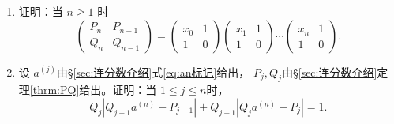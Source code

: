 \begin{exercise}
\begin{enumerate}
\begin{enumerate}[label=(\roman*)]
		      \end{enumerate}
		\item 证明：当 \( n \geqslant 1 \) 时
		      \begin{equation*}
			      \begin{pmatrix}
				      P_n & P_{n-1} \\
				      Q_n & Q_{n-1}
			      \end{pmatrix}
			      =
			      \begin{pmatrix}
				      x_0 & 1 \\
				      1   & 0
			      \end{pmatrix}
			      \begin{pmatrix}
				      x_1 & 1 \\
				      1   & 0
			      \end{pmatrix}
			      \cdots
			      \begin{pmatrix}
				      x_n & 1 \\
				      1   & 0
			      \end{pmatrix}.
		      \end{equation*}
		\item 设 \( a^{(j)} \)由\S\ref{sec:连分数介绍}式\eqref{eq:an标记}给出， \( P_j, Q_j
		      \)由\S\ref{sec:连分数介绍}定理\ref{thrm:PQ}给出。证明：当 \( 1 \leqslant j \leqslant n \)时，
		      \begin{equation*}
			      Q_j|Q_{j-1}a^{(n)}-P_{j-1}| + Q_{j-1}|Q_ja^{(n)} - P_j| = 1.
		      \end{equation*}

	\end{enumerate}
\end{exercise}

